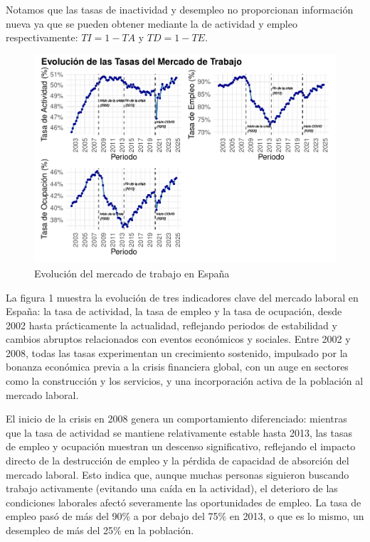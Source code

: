 \documentclass[Universitat de
València,article,submit,moreauthors,pdftex]{Definitions/mdpi}
\begin{document}
Notamos que las tasas de inactividad y desempleo no proporcionan
información nueva ya que se pueden obtener mediante la de actividad y
empleo respectivamente: \(TI = 1 - TA\) y \(TD = 1 - TE\).

\begin{figure}[h]

{\centering \includegraphics[width=1\linewidth]{ProyectoAED2024_files/figure-latex/unnamed-chunk-26-1} 

}

\caption{Evolución del mercado de trabajo en España}\label{fig:unnamed-chunk-26}
\end{figure}

La figura 1 muestra la evolución de tres indicadores clave del mercado
laboral en España: la tasa de actividad, la tasa de empleo y la tasa de
ocupación, desde 2002 hasta prácticamente la actualidad, reflejando
periodos de estabilidad y cambios abruptos relacionados con eventos
económicos y sociales. Entre 2002 y 2008, todas las tasas experimentan
un crecimiento sostenido, impulsado por la bonanza económica previa a la
crisis financiera global, con un auge en sectores como la construcción y
los servicios, y una incorporación activa de la población al mercado
laboral.

El inicio de la crisis en 2008 genera un comportamiento diferenciado:
mientras que la tasa de actividad se mantiene relativamente estable
hasta 2013, las tasas de empleo y ocupación muestran un descenso
significativo, reflejando el impacto directo de la destrucción de empleo
y la pérdida de capacidad de absorción del mercado laboral. Esto indica
que, aunque muchas personas siguieron buscando trabajo activamente
(evitando una caída en la actividad), el deterioro de las condiciones
laborales afectó severamente las oportunidades de empleo. La tasa de
empleo pasó de más del 90\% a por debajo del 75\% en 2013, o que es lo
mismo, un desempleo de más del 25\% en la población.
\end{document}
